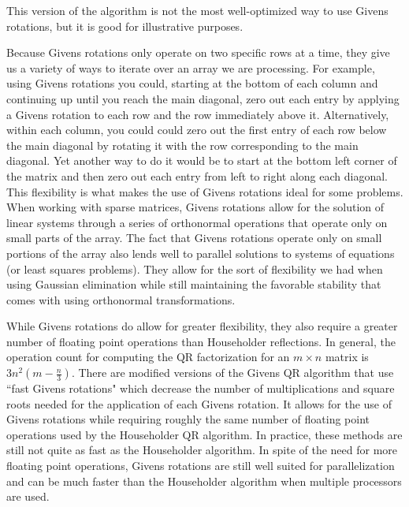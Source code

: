 This version of the algorithm is not the most well-optimized way to use Givens rotations, but it is good for illustrative purposes.

Because Givens rotations only operate on two specific rows at a time, they give us a variety of ways to iterate over an array we are processing.
For example, using Givens rotations you could, starting at the bottom of each column and continuing up until you reach the main diagonal, zero out each entry by applying a Givens rotation to each row and the row immediately above it.
Alternatively, within each column, you could could zero out the first entry of each row below the main diagonal by rotating it with the row corresponding to the main diagonal.
Yet another way to do it would be to start at the bottom left corner of the matrix and then zero out each entry from left to right along each diagonal.
This flexibility is what makes the use of Givens rotations ideal for some problems.
When working with sparse matrices, Givens rotations allow for the solution of linear systems through a series of orthonormal operations that operate only on small parts of the array.
The fact that Givens rotations operate only on small portions of the array also lends well to parallel solutions to systems of equations (or least squares problems).
They allow for the sort of flexibility we had when using Gaussian elimination while still maintaining the favorable stability that comes with using orthonormal transformations.

While Givens rotations do allow for greater flexibility, they also require a greater number of floating point operations than Householder reflections.
In general, the operation count for computing the QR factorization for an $m \times n$ matrix is $3 n^2 \left( m - \frac{n}{3} \right)$.
There are modified versions of the Givens QR algorithm that use ``fast Givens rotations" which decrease the number of multiplications and square roots needed for the application of each Givens rotation.
It allows for the use of Givens rotations while requiring roughly the same number of floating point operations used by the Householder QR algorithm.
In practice, these methods are still not quite as fast as the Householder algorithm.
In spite of the need for more floating point operations, Givens rotations are still well suited for parallelization and can be much faster than the Householder algorithm when multiple processors are used.

